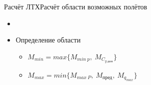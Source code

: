 \begin{frame}{Расчёт ЛТХ}{Расчёт области возможных полётов}
    \begin{minipage}[c]{0.55\textwidth}
    \end{minipage}
    \begin{minipage}[c]{0.4\textwidth}
        \begin{itemize}
            \item <+-> []
            \item <+-> [] \begin{block}{Определение области}
                \begin{itemize}
                    \item $M_{min} = max \{ M_{min \ p}, \ M_{C_{y \ \text{доп}}} \} $
                    \item $M_{max} = min \{ M_{max \ P}, \ M_{\text{пред}}, \ M_{q_{max}} \}$
                \end{itemize}
            \end{block}
        \end{itemize}
    \end{minipage}
\end{frame}

